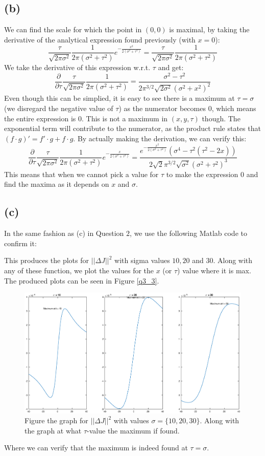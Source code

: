 \documentclass[a4paper]{article}
\def\dpip{|\!|}
\begin{document}
\subsection*{(b)}
We can find the scale for which the point in $(0,0)$ is maximal, by taking the derivative of the analytical expression found previously (with $x=0$):
$$
\frac{\tau}{\sqrt{2\pi\sigma^2}} \frac{1}{2\pi(\sigma^2 + \tau^2)} e^{- \frac{x^2}{2(\sigma^2 + \tau^2)} } = \frac{\tau}{\sqrt{2\pi\sigma^2}} \frac{1}{2\pi(\sigma^2 + \tau^2)}
$$
We take the derivative of this expression w.r.t. $\tau$ and get:
$$
\frac{\partial}{\partial \tau} \frac{\tau}{\sqrt{2\pi \sigma^2}} \frac{1}{2\pi(\sigma^2 + \tau^2)} = \frac{\sigma^2-\tau^2}{2\pi^{3/2}\sqrt{2\sigma^2}(\sigma^2+x^2)^2}
$$
Even though this can be simplied, it is easy to see there is a maximum at $\tau=\sigma$ (we disregard the negative value of $\tau$) as the numerator becomes $0$, which means the entire expression is $0$. This is not a maximum in $(x, y, \tau)$ though. The exponential term will contribute to the numerator, as the product rule states that $(f\cdot g)'=f'\cdot g + f\cdot g$. By actually making the derivation, we can verify this:
$$
\frac{\partial}{\partial \tau} \frac{\tau}{\sqrt{2\pi \sigma^2}} \frac{1}{2\pi(\sigma^2 + \tau^2)} e^{-\frac{x}{2(\sigma^2+\tau^2)}} = \frac{e^{-\frac{x^2}{2(\sigma^2+\tau^2)}}(\sigma^4-\tau^2(\tau^2-2x))}{2\sqrt{2}\pi^{3/2}\sqrt{\sigma^2}(\sigma^2+\tau^2)^3}
$$
This means that when we cannot pick a value for $\tau$ to make the expression $0$ and find the maxima as it depends on $x$ and $\sigma$.

\subsection*{(c)}
In the same fashion as (c) in Question $2$, we use the following Matlab code to confirm it:

This produces the plots for $\dpip\Delta J\dpip^2$ with sigma values $10,20$ and $30$. Along with any of these function, we plot the values for the $x$ (or $\tau$) value where it is max. The produced plots can be seen in Figure \ref{q3_3}.
\begin{figure}[H]
  \centering
  \captionsetup{justification=centering}
\includegraphics[width=\textwidth]{q3_3.eps}
\caption{Figure the graph for $\dpip\Delta J\dpip^2$ with values $\sigma=\{10,20,30\}$. Along with the graph at what $\tau$-value the maximum if found.}
  \label{q4_4}
\end{figure}
Where we can verify that the maximum is indeed found at $\tau=\sigma$.
\end{document}
